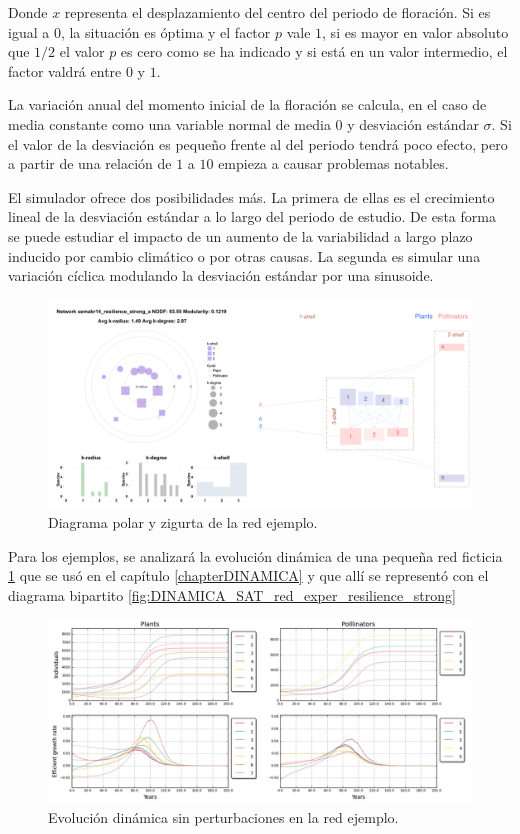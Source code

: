 Donde $x$ representa el desplazamiento del centro del periodo de floración. Si es igual a $0$, la situación es óptima y el factor $p$ vale $1$, si es mayor en valor absoluto que $1/2$ el valor $p$ es cero como se ha indicado y si está en un valor intermedio, el factor valdrá entre $0$ y $1$.

La variación anual del momento inicial de la floración se calcula, en el caso de media constante como una variable normal de media $0$ y desviación estándar $\sigma$. Si el valor de la desviación es pequeño frente al del periodo tendrá poco efecto, pero a partir de una relación de $1$ a $10$ empieza a causar problemas notables.

El simulador ofrece dos posibilidades más. La primera de ellas es el crecimiento lineal de la desviación estándar a lo largo del periodo de estudio. De esta forma se puede estudiar el impacto de un aumento de la variabilidad a largo plazo inducido por cambio climático o por otras causas. La segunda es simular una variación cíclica modulando la desviación estándar por una sinusoide.

\begin{figure}[h!]
\centering
\includegraphics[scale=1]{ManFigs/sigmund_oscilacion_diag_red.png}
\caption{Diagrama polar y zigurta de la red ejemplo.}
\label{fig:ASIGMUNDMAN_sigmund_oscilacion_diag_red}
\end{figure}

Para los ejemplos, se analizará la evolución dinámica de una pequeña red ficticia \ref{fig:ASIGMUNDMAN_sigmund_oscilacion_diag_red} que se usó en el capítulo \ref{chapterDINAMICA} y que allí se representó con el diagrama bipartito \ref{fig:DINAMICA_SAT_red_exper_resilience_strong}

\begin{figure}[h!]
\centering
\includegraphics[scale=1]{ManFigs/sigmund_red_exper.png}
\caption{Evolución dinámica sin perturbaciones en la red ejemplo.}
\label{fig:ASIGMUNDMAN_sigmund_red_exper}
\end{figure}

